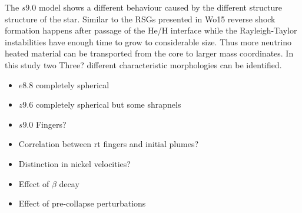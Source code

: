 \documentclass[fleqn,usenatbib]{mnras}
\newcommand{\COM}[1]{{\color{red}#1}}
\begin{document}
The $s9.0$ model shows a different behaviour caused by the different structure structure of the star. Similar to the RSGs presented in Wo15 reverse shock formation happens after passage of the He/H interface while the Rayleigh-Taylor instabilities have enough time to grow to considerable size. Thus more neutrino heated material can be transported from the core to larger mass coordinates. 
In this study two \COM{Three?} different characteristic morphologies can be identified. 
\begin{itemize}
    \item \COM{$e8.8$ completely spherical}
    \item \COM{$z9.6$ completely spherical but some shrapnels }
    \item \COM{$s9.0$ Fingers?}
\end{itemize}
\begin{itemize}
    \item \COM{Correlation between rt fingers and initial plumes?}
    \item \COM{Distinction in nickel velocities?}
    \item \COM{Effect of $\beta$ decay}
    \item \COM{Effect of pre-collapse perturbations}
\end{itemize}
\end{document}
